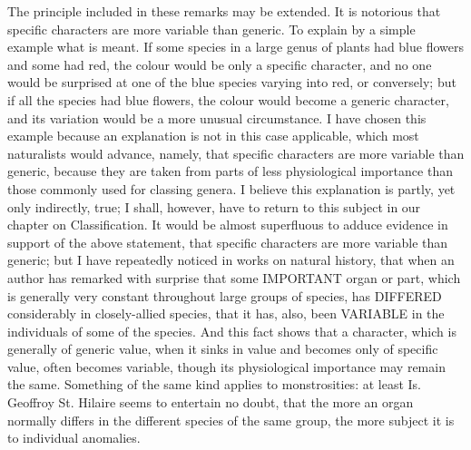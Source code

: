 The principle included in these remarks may be extended. It is notorious that specific characters are more variable than generic. To explain by a simple example what is meant. If some species in a large genus of plants had blue flowers and some had red, the colour would be only a specific character, and no one would be surprised at one of the blue species varying into red, or conversely; but if all the species had blue flowers, the colour would become a generic character, and its variation would be a more unusual circumstance. I have chosen this example because an explanation is not in this case applicable, which most naturalists would advance, namely, that specific characters are more variable than generic, because they are taken from parts of less physiological importance than those commonly used for classing genera. I believe this explanation is partly, yet only indirectly, true; I shall, however, have to return to this subject in our chapter on Classification. It would be almost superfluous to adduce evidence in support of the above statement, that specific characters are more variable than generic; but I have repeatedly noticed in works on natural history, that when an author has remarked with surprise that some IMPORTANT organ or part, which is generally very constant throughout large groups of species, has DIFFERED considerably in closely-allied species, that it has, also, been VARIABLE in the individuals of some of the species. And this fact shows that a character, which is generally of generic value, when it sinks in value and becomes only of specific value, often becomes variable, though its physiological importance may remain the same. Something of the same kind applies to monstrosities: at least Is. Geoffroy St. Hilaire seems to entertain no doubt, that the more an organ normally differs in the different species of the same group, the more subject it is to individual anomalies.
